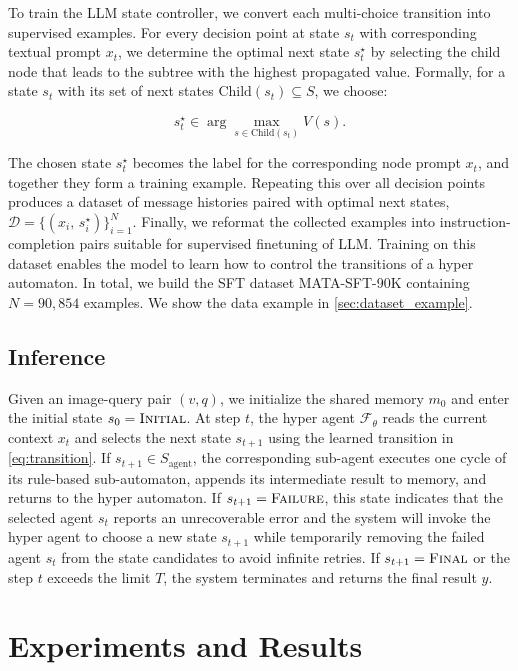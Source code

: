\documentclass{article} %
\newcommand{\revise}[1]{{#1}}
\newcommand{\methodname}{MATA}
\newcommand{\datasetname}{\methodname-SFT-90K}
\begin{document}
To train the LLM state controller, we convert each multi-choice transition into supervised examples. For every decision point at state $s_t$ with corresponding textual prompt $x_t$, we determine the optimal next state $s_t^{\star}$ by selecting the child node that leads to the subtree with the highest propagated value. Formally, for a state $s_t$ with its set of next states $\mathrm{Child}(s_t) \subseteq S$, we choose:

\begin{equation}
s_t^{\star} \in \arg\max_{s \in \mathrm{Child}(s_t)} V(s).
\end{equation}

The chosen state $s_t^{\star}$ becomes the label for the corresponding node prompt $x_t$, and together they form a training example. Repeating this over all decision points produces a dataset of message histories paired with optimal next states, $\mathcal{D}=\{(x_i,\, s_i^{\star})\}_{i=1}^{N}$.
Finally, we reformat the collected examples into instruction-completion pairs suitable for supervised finetuning of LLM. Training on this dataset enables the model to learn how to control the transitions of a hyper automaton. In total, we build the SFT dataset \datasetname{} containing $N=90{,}854$ examples. \revise{We show the data example in \autoref{sec:dataset_example}.}


\subsection{Inference}
\label{sec:inference}

Given an image-query pair $(v,q)$, we initialize the shared memory $m_0$ and enter the initial state $s_0=\textsc{Initial}$. At step $t$, the hyper agent $\mathcal{F}_\theta$ reads the current context $x_t$ and selects the next state $s_{t+1}$ using the learned transition in \autoref{eq:transition}. If $s_{t+1}\in S_{\text{agent}}$, the corresponding sub-agent executes one cycle of its rule-based sub-automaton, appends its intermediate result to memory, and returns to the hyper automaton.
If $s_{t+1} = \textsc{Failure}$, this state indicates that the selected agent $s_t$ reports an unrecoverable error and the system will invoke the hyper agent to choose a new state $s_{t+1}$ while temporarily removing the failed agent $s_t$ from the state candidates to avoid infinite retries. If $s_{t+1} = \textsc{Final}$ or the step $t$ exceeds the limit $T$, the system terminates and returns the final result $\hat{y}$. 

\section{Experiments and Results}
\end{document}
